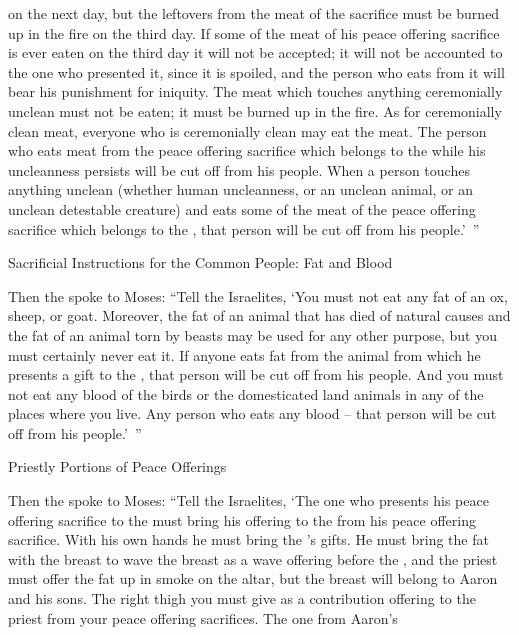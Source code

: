 {on the next day,
but the leftovers
from the meat
of the sacrifice
must be burned up
in the fire
on
the third
day.
If
some of the meat
of his peace offering
sacrifice
is ever eaten
on the third
day
it will not
be accepted;
it will
not
be
accounted
to the one who presented
it, since it is spoiled,
and the person
who eats
from
it will bear
his punishment for iniquity.
The meat
which
touches
anything
ceremonially unclean
must not
be eaten;
it must be burned up
in the fire.
As for ceremonially clean meat,
everyone
who is ceremonially clean
may eat
the meat.
The person
who
eats
meat
from the peace offering
sacrifice
which
belongs to the
{}
while his uncleanness
persists will be cut off
from his people.
When a person
touches
anything
unclean
(whether human
uncleanness,
or
an unclean
animal,
or
an unclean
detestable
creature) and eats
some of the meat
of the peace offering
sacrifice
which
belongs to the
{}, that person
will be cut off
from his people.’ ”
\par }{\SH Sacrificial Instructions for the Common People: Fat and Blood
\par }{\PP {}Then the
{}
spoke
to
Moses:
“Tell
the Israelites,
‘You must not
eat
any
fat
of an ox,
sheep,
or goat.
Moreover, the fat
of an animal that has died of natural causes
and the fat
of an animal torn
by beasts may be used
for any other
purpose,
but you must certainly
never
eat it.
If
anyone
eats
fat
from
the animal
from which
he presents
a gift
to the
{}, that person will be cut off
from his people.
And you must not
eat
any
blood
of the birds
or the domesticated
land animals
in any
of the places where you live.
Any
person
who
eats
any
blood
– that person will be cut off
from his people.’ ”
\par }{\SH Priestly Portions of Peace Offerings
\par }{\PP {}Then the
{}
spoke
to
Moses:
“Tell
the Israelites,
‘The one who presents
his peace offering
sacrifice
to the
{}
must bring
his offering
to the
{}
from his peace offering sacrifice.
With his own hands
he must bring
the
{}’s
gifts.
He must bring
the fat
with the breast
to wave
the breast
as a wave offering
before
the {},
and the priest
must
offer
the fat
up in smoke on the altar,
but
the breast
will belong to Aaron
and his sons.
The right
thigh
you must give
as a contribution
offering to the priest
from your peace offering
sacrifices.
The one from Aaron’s
}
